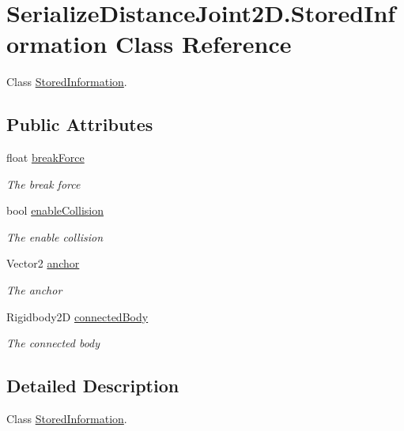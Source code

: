 \hypertarget{class_serialize_distance_joint2_d_1_1_stored_information}{}\section{Serialize\+Distance\+Joint2\+D.\+Stored\+Information Class Reference}
\label{class_serialize_distance_joint2_d_1_1_stored_information}


Class \hyperlink{class_serialize_distance_joint2_d_1_1_stored_information}{Stored\+Information}.  


\subsection*{Public Attributes}
\begin{DoxyCompactItemize}
\item 
float \hyperlink{class_serialize_distance_joint2_d_1_1_stored_information_a07a2b3b6133e0bbba82544697847535c}{break\+Force}
\begin{DoxyCompactList}\small\item\em The break force \end{DoxyCompactList}\item 
bool \hyperlink{class_serialize_distance_joint2_d_1_1_stored_information_ae306bdb9d3a3149698e4a2db0f905f0b}{enable\+Collision}
\begin{DoxyCompactList}\small\item\em The enable collision \end{DoxyCompactList}\item 
Vector2 \hyperlink{class_serialize_distance_joint2_d_1_1_stored_information_a3f04947cc7a1267139be58ce088fea67}{anchor}
\begin{DoxyCompactList}\small\item\em The anchor \end{DoxyCompactList}\item 
Rigidbody2D \hyperlink{class_serialize_distance_joint2_d_1_1_stored_information_a379a53b2c607fed0362049dac3b1a1c2}{connected\+Body}
\begin{DoxyCompactList}\small\item\em The connected body \end{DoxyCompactList}\end{DoxyCompactItemize}


\subsection{Detailed Description}
Class \hyperlink{class_serialize_distance_joint2_d_1_1_stored_information}{Stored\+Information}. 



